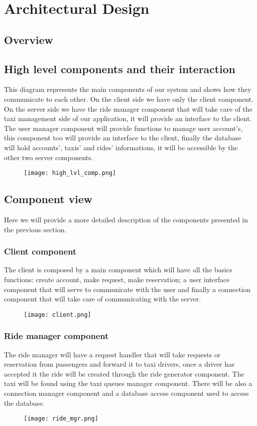 \section{Architectural Design}

\subsection{Overview}

\subsection{High level components and their interaction}
	This diagram represents the main components of our system and shows how they communicate to each other. On the client side we have only the client component. 
	On the server side we have the ride manager component that will take care of the taxi management side of our application, it will provide an interface to the client. The user manager component will provide functions to manage user account's, this component too will provide an interface to the client, finally the database will hold accounts', taxis' and rides' informations, it will be accessible by the other two server components.
	\begin{figure}[h!]
		\centering
		\texttt{[image: high\_lvl\_comp.png]}
	\end{figure}
	\newpage
	
\subsection{Component view}
	Here we will provide a more detailed description of the components presented in the previous section.
	\subsubsection{Client component}
	The client is composed by a main component which will have all the basics functions: create account, make request, make reservation; a user interface component that will serve to communicate with the user and finally a connection component that will take care of communicating with the server.
		\begin{figure}[h!]
			\centering
			\texttt{[image: client.png]}
		\end{figure}
		\newpage

	\subsubsection{Ride manager component}
		The ride manager will have a request handler that will take requests or reservation from passengers and forward it to taxi drivers, once a driver has accepted it the ride will be created through the ride generator component. The taxi will be found using the taxi queues manager component. There will be also a connection manager component and a database access component used to access the database.
		\begin{figure}[h!]
			\centering
			\texttt{[image: ride\_mgr.png]}
		\end{figure}
		\newpage

